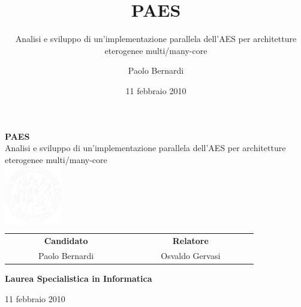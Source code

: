 \documentclass[11pt,xcolor=dvipsnames]{beamer}
\title{PAES}
\author{Paolo Bernardi}
\subtitle{Analisi e sviluppo di un'implementazione parallela dell'AES per architetture eterogenee 
multi/many-core}
\institute{Università degli Studi di Perugia --- Laurea Specialistica in Informatica}
\date{11 febbraio 2010}
\begin{document}
\begin{frame}[plain]
\end{frame}

\begin{frame}[plain]
	\begin{center}
	\begin{block}{}
	\begin{center}
	\vspace{2mm}
	{\Large \textbf{{PAES}}}\\
	\vspace{2mm}
	{\footnotesize Analisi e sviluppo di un'implementazione parallela dell'AES per architetture eterogenee  multi/many-core}\\
	\vspace{3mm}
	\includegraphics[height=25mm]{img/unipg.pdf}
	\vspace{2mm}
	\end{center}
	\end{block}

	\vspace{7mm}
	\begin{tabular}{c c}
	~~~~~~~\textcolor{OliveGreen}{\textbf{Candidato}}~~~~~~~ & ~~~~~~~\textcolor{OliveGreen}{\textbf{Relatore}}~~~~~~~ \\
	~~~~~~~Paolo Bernardi~~~~~~~ & ~~~~~~~Osvaldo Gervasi~~~~~~~ \\
	\end{tabular}
	
	\vspace{7mm}
    \textcolor{OliveGreen}{\textbf{Laurea Specialistica in Informatica}}

	\vspace{4mm}
	{\scriptsize 11 febbraio 2010}
	\end{center}
\end{frame}
 
\end{document}
